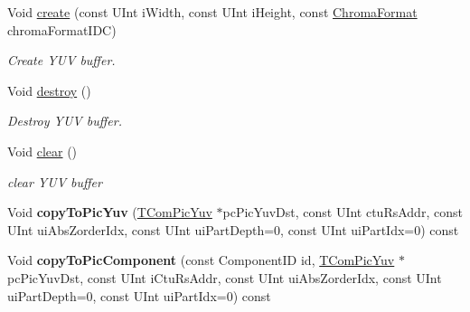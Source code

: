 \begin{DoxyCompactItemize}
\item 
\mbox{\label{class_t_com_yuv_af2a4457789efd3b7ece3bffaba0428df}} 
Void \hyperlink{class_t_com_yuv_af2a4457789efd3b7ece3bffaba0428df}{create} (const U\+Int i\+Width, const U\+Int i\+Height, const \hyperlink{_type_def_8h_a4a6c51c10f2eb04abc7209db7caff39f}{Chroma\+Format} chroma\+Format\+I\+DC)
\begin{DoxyCompactList}\small\item\em Create Y\+UV buffer. \end{DoxyCompactList}\item 
\mbox{\label{class_t_com_yuv_af39247b18c610b282a0723676d68d249}} 
Void \hyperlink{class_t_com_yuv_af39247b18c610b282a0723676d68d249}{destroy} ()
\begin{DoxyCompactList}\small\item\em Destroy Y\+UV buffer. \end{DoxyCompactList}\item 
\mbox{\label{class_t_com_yuv_ae73c74b2ea1730f909ebb30182df4b6a}} 
Void \hyperlink{class_t_com_yuv_ae73c74b2ea1730f909ebb30182df4b6a}{clear} ()
\begin{DoxyCompactList}\small\item\em clear Y\+UV buffer \end{DoxyCompactList}\item 
\mbox{\label{class_t_com_yuv_a15b15a70fbaac30db7fd8ef03853243c}} 
Void {\bfseries copy\+To\+Pic\+Yuv} (\hyperlink{class_t_com_pic_yuv}{T\+Com\+Pic\+Yuv} $\ast$pc\+Pic\+Yuv\+Dst, const U\+Int ctu\+Rs\+Addr, const U\+Int ui\+Abs\+Zorder\+Idx, const U\+Int ui\+Part\+Depth=0, const U\+Int ui\+Part\+Idx=0) const
\item 
\mbox{\label{class_t_com_yuv_a22a1193391fcc44cb5fabee6e1989000}} 
Void {\bfseries copy\+To\+Pic\+Component} (const Component\+ID id, \hyperlink{class_t_com_pic_yuv}{T\+Com\+Pic\+Yuv} $\ast$pc\+Pic\+Yuv\+Dst, const U\+Int i\+Ctu\+Rs\+Addr, const U\+Int ui\+Abs\+Zorder\+Idx, const U\+Int ui\+Part\+Depth=0, const U\+Int ui\+Part\+Idx=0) const
\item 
\mbox{\label{class_t_com_yuv_aa26be3c6f602ea197b1ec380817e0929}} 

\end{DoxyCompactItemize}
